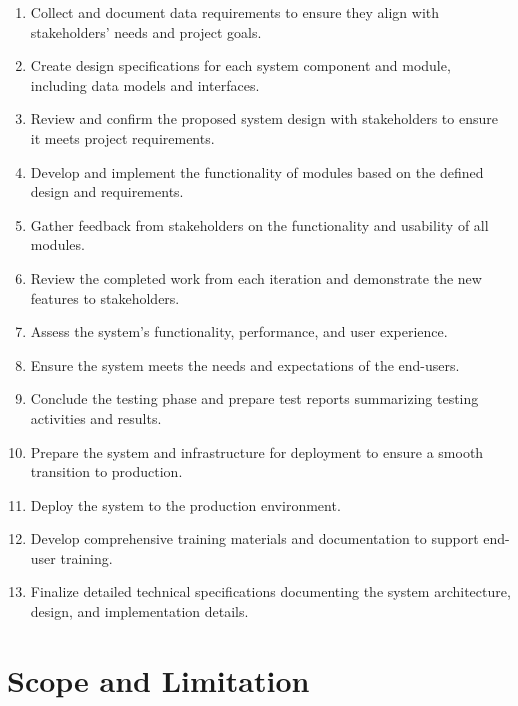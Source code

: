     \begin{enumerate}
        \item Collect and document data requirements to ensure they align with stakeholders' needs and project goals.
        \item Create design specifications for each system component and module, including data models and interfaces.
        \item Review and confirm the proposed system design with stakeholders to ensure it meets project requirements.
        \item Develop and implement the functionality of modules based on the defined design and requirements.

        \item Gather feedback from stakeholders on the functionality and usability of all modules.
        \item Review the completed work from each iteration and demonstrate the new features to stakeholders.
        \item Assess the system's functionality, performance, and user experience.
        \item Ensure the system meets the needs and expectations of the end-users.
        \item Conclude the testing phase and prepare test reports summarizing testing activities and results.
        \item Prepare the system and infrastructure for deployment to ensure a smooth transition to production.
        \item Deploy the system to the production environment.
        \item Develop comprehensive training materials and documentation to support end-user training.
        \item Finalize detailed technical specifications documenting the system architecture, design, and implementation details.
    \end{enumerate}
    
\section{Scope and Limitation}
    

